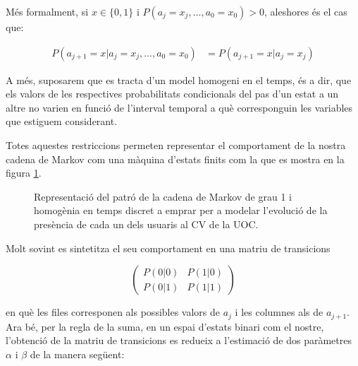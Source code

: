 \documentclass[
	a4paper,
	twoside,
	justified
]{tufte-book}
\begin{document}
Més formalment, si $x \in \{0,1\}$ i $P(a_{j} = x_j, \ldots, a_0 = x_0) > 0$, aleshores és el cas que:

\begin{align*}
	P(a_{j+1} = x | a_{j} = x_j, \ldots, a_0 = x_0) & = P(a_{j+1} = x | a_{j} = x_j)
\end{align*}

A més, suposarem que es tracta d'un model homogeni en el temps, és a dir, que els valors de les respectives probabilitats condicionals del pas d'un estat a un altre no varien en funció de l'interval temporal a què corresponguin les variables que estiguem considerant. 

Totes aquestes restriccions permeten representar el comportament de la nostra cadena de Markov com una màquina d'estats finits com la que es mostra en la figura \ref{dia:simple_mc}. 

\begin{figure}
\begin{center}
\end{center}
\caption{
	\label{dia:simple_mc}
	Representació del patró de la cadena de Markov de grau 1 i homogènia en temps discret a emprar per a modelar l'evolució de la presència de cada un dels usuaris al CV de la UOC. 
}
\end{figure}

Molt sovint es sintetitza el seu comportament en una matriu de transicions

$$
\begin{pmatrix}
P(0|0) & P(1|0) \\
P(0|1) & P(1|1)
\end{pmatrix}
$$

en què les files corresponen als possibles valors de $a_j$ i les columnes als de $a_{j+1}$. Ara bé, per la regla de la suma, en un espai d'estats binari com el nostre, l'obtenció de la matriu de transicions es redueix a l'estimació de dos paràmetres $\alpha$ i $\beta$ de la manera següent:
\end{document}
